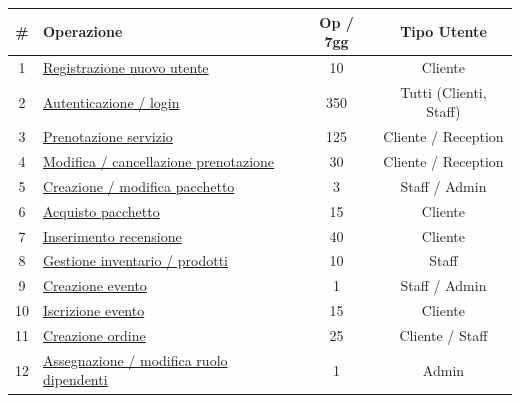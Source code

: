 \documentclass[a4paper,12pt]{report}
\begin{document}
\begin{table}[H]
	\centering
	\small
	\renewcommand{\arraystretch}{1.12}
	\begin{tabularx}{\textwidth}{|c|>{\raggedright\arraybackslash}X|c|c|}
		\hline
		\rowcolor{gray!20}
		\textbf{\#} & \textbf{Operazione}                                                    & \textbf{Op / 7gg} & \textbf{Tipo Utente}   \\
		\hline
		1           & \hyperref[op1]{Registrazione nuovo utente}                             & 10                & Cliente                \\
		\hline
		2           & \hyperref[op2]{Autenticazione / login}                                 & 350               & Tutti (Clienti, Staff) \\
		\hline
		3           & \hyperref[op3]{Prenotazione servizio}                                  & 125               & Cliente / Reception    \\
		\hline
		4           & \hyperref[op4]{Modifica / cancellazione prenotazione}                  & 30                & Cliente / Reception    \\
		\hline
		5           & \hyperref[op5]{Creazione / modifica pacchetto}                         & 3                 & Staff / Admin          \\
		\hline
		6           & \hyperref[op6]{Acquisto pacchetto}                                     & 15                & Cliente                \\
		\hline
		7           & \hyperref[op7]{Inserimento recensione}                                 & 40                & Cliente                \\
		\hline
		8           & \hyperref[op8]{Gestione inventario / prodotti}                         & 10                & Staff                  \\
		\hline
		9           & \hyperref[op9]{Creazione evento}                                       & 1                 & Staff / Admin          \\
		\hline
		10          & \hyperref[op10]{Iscrizione evento}                                     & 15                & Cliente                \\
		\hline
		11          & \hyperref[op11]{Creazione ordine}                                      & 25                & Cliente / Staff        \\
		\hline
		12          & \hyperref[op12]{Assegnazione / modifica ruolo dipendenti}              & 1                 & Admin                  \\

\end{tabularx}
\end{table}
\end{document}
